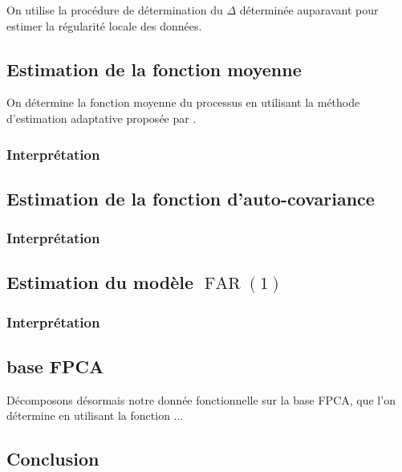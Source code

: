 On utilise la procédure de détermination du $\Delta$ déterminée auparavant pour estimer la régularité locale des données.

\subsection{Estimation de la fonction moyenne}

On détermine la fonction moyenne du processus en utilisant la méthode d'estimation adaptative proposée par \cite{golovkine2021adaptive}.

\subsubsection{Interprétation}

\subsection{Estimation de la fonction d'auto-covariance}

\subsubsection{Interprétation}

\subsection{Estimation du modèle $\operatorname{FAR}(1)$}

\subsubsection{Interprétation}

\subsection{base FPCA}

Décomposons désormais notre donnée fonctionnelle sur la base FPCA, que l'on détermine en utilisant la fonction ...

\subsection{Conclusion}
